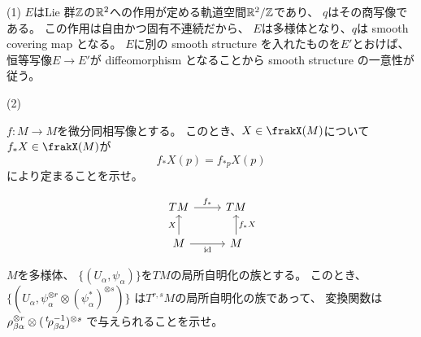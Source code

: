 \documentclass[report]{jlreq}
\begin{document}
\begin{answer}
    (1) $E$はLie 群$\mathbb{Z}$の$\mathbb{R}^2$への{\smooth}作用が定める軌道空間$\mathbb{R}^2/\mathbb{Z}$であり、
    $q$はその商写像である。
    この作用は自由かつ固有不連続だから、
    $E$は多様体となり、$q$は smooth covering map となる。
    $E$に別の smooth structure を入れたものを$E'$とおけば、
    恒等写像$E \to E'$が diffeomorphism となることから
    smooth structure の一意性が従う。

    (2)
    \TODO{}
\end{answer}

\begin{problem}
    $f \colon M \to M$を微分同相写像とする。
    このとき、$X \in \frakX(M)$について
    $f_*X \in \frakX(M)$が
    \begin{equation}
        f_* X(p) = f_{*p} X(p)
    \end{equation}
    により定まることを示せ。
\end{problem}

\begin{answer}
    \begin{equation}
        \begin{tikzcd}
            TM \ar{r}{f_*} & TM \\
            M \ar{u}{X} \ar{r}[swap]{\id} & M \ar{u}[swap]{f_* X}
        \end{tikzcd}
    \end{equation}
\end{answer}

\begin{problem}[幾何学III 問2.1.8]
    $M$を多様体、
    $\{ (U_\alpha, \psi_\alpha) \}$を$TM$の局所自明化の族とする。
    このとき、
    $\{ (U_\alpha, \psi_\alpha^{\otimes r} \otimes (\psi_\alpha^*)^{\otimes s}) \}$
    は$T^{r, s} M$の局所自明化の族であって、
    変換関数は$\rho_{\beta\alpha}^{\otimes r}
    \otimes (\,{}^{t}\! \rho_{\beta\alpha}^{-1})^{\otimes s}$
    で与えられることを示せ。
\end{problem}

\begin{answer}
    \TODO{}
\end{answer}

\end{document}
